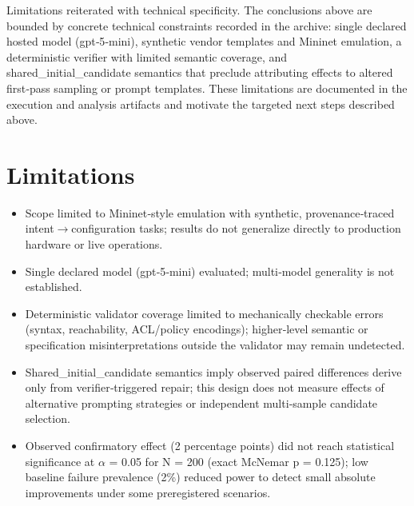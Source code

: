 \documentclass[conference]{IEEEtran}
\begin{document}
Limitations reiterated with technical specificity. The conclusions above are bounded by concrete technical constraints recorded in the archive: single declared hosted model (gpt‑5‑mini), synthetic vendor templates and Mininet emulation, a deterministic verifier with limited semantic coverage, and shared\_initial\_candidate semantics that preclude attributing effects to altered first‑pass sampling or prompt templates. These limitations are documented in the execution and analysis artifacts and motivate the targeted next steps described above.

\section{Limitations}
\begin{itemize}
\item Scope limited to Mininet‑style emulation with synthetic, provenance‑traced intent\ensuremath{\rightarrow}configuration tasks; results do not generalize directly to production hardware or live operations.
\item Single declared model (gpt‑5‑mini) evaluated; multi‑model generality is not established.
\item Deterministic validator coverage limited to mechanically checkable errors (syntax, reachability, ACL/policy encodings); higher‑level semantic or specification misinterpretations outside the validator may remain undetected.
\item Shared\_initial\_candidate semantics imply observed paired differences derive only from verifier‑triggered repair; this design does not measure effects of alternative prompting strategies or independent multi‑sample candidate selection.
\item Observed confirmatory effect (2 percentage points) did not reach statistical significance at \ensuremath{\alpha} = 0.05 for N = 200 (exact McNemar p = 0.125); low baseline failure prevalence (2\%) reduced power to detect small absolute improvements under some preregistered scenarios.
\end{itemize}
\end{document}
